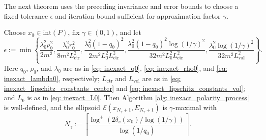\documentclass[smallextended]{svjour3}
\newcommand{\E}{\mathcal{E}}
\begin{document}
The next theorem uses the preceding invariance and error bounds to choose a fixed
tolerance $\epsilon$ and iteration bound sufficient for approximation factor
$\gamma$.
\begin{theorem}\label{thm: inexact_fixed_tolerance}
    Choose $x_0\in \mathrm{int}(P)$,  fix $\gamma\in (0,1)$, and let
    \[
        \epsilon
        :=
        \min\left\{
            \frac{\lambda_0^2\rho_0^2}{2m^2},
            \frac{\lambda_0^2r_0^2}{8m^2L_{\mathrm{ctr}}^2},
            \frac{\lambda_0^2(1-q_0)^2}{2m^2L_0^2L_{\mathrm{ctr}}^2},
            \frac{\lambda_0^2(1-q_0)^2 \log(1/\gamma)^2}{32m^2L_0^2L_{\mathrm{ctr}}^2},
            \frac{\lambda_0^2\log(1/\gamma)^2}{32m^2L_{\mathrm{vol}}^2}
        \right\}.
    \]
    Here $q_0$, $\rho_0$, and $\lambda_0$ are as in \eqref{eq: inexact_q0}, \eqref{eq: inexact_rho0}, and \eqref{eq: inexact_lambda0}, respectively;
    $L_{\mathrm{ctr}}$ and $L_{\mathrm{vol}}$ are as in \eqref{eq: inexact_lipschitz_constants_center} and \eqref{eq: inexact_lipschitz_constants_vol}; and $L_0$ is as in \eqref{eq: inexact_L0}.
    Then Algorithm \ref{alg: inexact_polarity_process} is well-defined, and the ellipsoid
    $\E(x_{N_\gamma+1},E_{N_\gamma+1})$ is $\gamma$-maximal with
    \[
        N_\gamma
        :=
        \left\lceil
            \frac{\log^+(2\delta_v(x_0)/\log(1/\gamma))}{\log(1/q_0)}
        \right\rceil.
    \]
\end{theorem}
\end{document}
